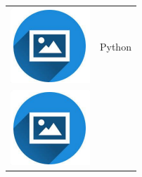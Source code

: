 \documentclass{article}
\begin{document}
\begin{paracol}{2}
        \begin{tabular}{ll}
         \begin{minipage}{0.1\linewidth}
         \includegraphics[width=\linewidth]{picon.png}
         \end{minipage} & {Python} \\[10pt]
         \begin{minipage}{0.1\linewidth}
         \includegraphics[width=\linewidth]{picon.png}

\end{minipage}
\end{tabular}
\end{paracol}
\end{document}

